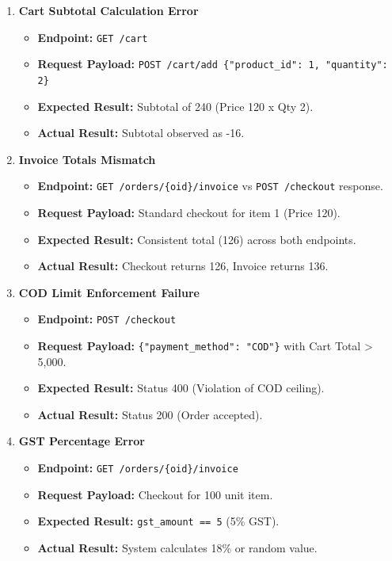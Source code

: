 \documentclass{article}
\begin{document}
\begin{enumerate}
    \item \textbf{Cart Subtotal Calculation Error}
    \begin{itemize}
        \item \textbf{Endpoint:} \texttt{GET /cart}
        \item \textbf{Request Payload:} \texttt{POST /cart/add \{"product_id": 1, "quantity": 2\}}
        \item \textbf{Expected Result:} Subtotal of 240 (Price 120 x Qty 2).
        \item \textbf{Actual Result:} Subtotal observed as -16.
    \end{itemize}

    \item \textbf{Invoice Totals Mismatch}
    \begin{itemize}
        \item \textbf{Endpoint:} \texttt{GET /orders/\{oid\}/invoice} vs \texttt{POST /checkout} response.
        \item \textbf{Request Payload:} Standard checkout for item 1 (Price 120).
        \item \textbf{Expected Result:} Consistent total (126) across both endpoints.
        \item \textbf{Actual Result:} Checkout returns 126, Invoice returns 136.
    \end{itemize}

    \item \textbf{COD Limit Enforcement Failure}
    \begin{itemize}
        \item \textbf{Endpoint:} \texttt{POST /checkout}
        \item \textbf{Request Payload:} \texttt{\{"payment_method": "COD"\}} with Cart Total > 5,000.
        \item \textbf{Expected Result:} Status 400 (Violation of COD ceiling).
        \item \textbf{Actual Result:} Status 200 (Order accepted).
    \end{itemize}

    \item \textbf{GST Percentage Error}
    \begin{itemize}
        \item \textbf{Endpoint:} \texttt{GET /orders/\{oid\}/invoice}
        \item \textbf{Request Payload:} Checkout for 100 unit item.
        \item \textbf{Expected Result:} \texttt{gst_amount == 5} (5\% GST).
        \item \textbf{Actual Result:} System calculates 18\% or random value.
    \end{itemize}


\end{enumerate}
\end{document}
